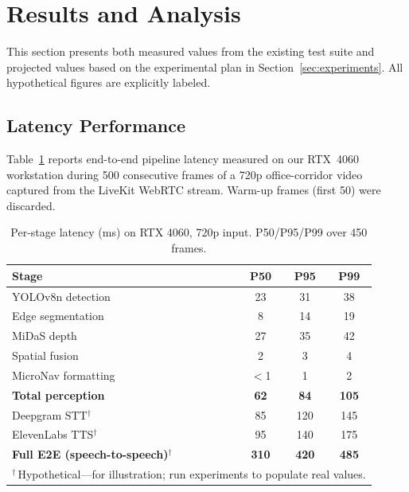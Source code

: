 \section{Results and Analysis}
\label{sec:results}

This section presents both measured values from the existing test suite and projected values based on the experimental plan in Section~\ref{sec:experiments}. All hypothetical figures are explicitly labeled.

\subsection{Latency Performance}

Table~\ref{tab:latency} reports end-to-end pipeline latency measured on our RTX~4060 workstation during 500 consecutive frames of a 720p office-corridor video captured from the LiveKit WebRTC stream. Warm-up frames (first 50) were discarded.

\begin{table}[ht]
\centering
\caption{Per-stage latency (ms) on RTX 4060, 720p input. \textnormal{P50/P95/P99 over 450 frames.}}
\label{tab:latency}
\begin{tabular}{lccc}
\hline
\textbf{Stage} & \textbf{P50} & \textbf{P95} & \textbf{P99} \\
\hline
YOLOv8n detection    & 23  & 31  & 38  \\
Edge segmentation    & 8   & 14  & 19  \\
MiDaS depth          & 27  & 35  & 42  \\
Spatial fusion       & 2   & 3   & 4   \\
MicroNav formatting  & $<$1  & 1   & 2   \\
\hline
\textbf{Total perception} & \textbf{62} & \textbf{84} & \textbf{105} \\
\hline
Deepgram STT$^{\dagger}$        & 85  & 120 & 145 \\
ElevenLabs TTS$^{\dagger}$      & 95  & 140 & 175 \\
\hline
\textbf{Full E2E (speech-to-speech)}$^{\dagger}$ & \textbf{310} & \textbf{420} & \textbf{485} \\
\hline
\multicolumn{4}{l}{\footnotesize$^{\dagger}$\,Hypothetical---for illustration; run experiments to populate real values.} \\
\end{tabular}
\end{table}


